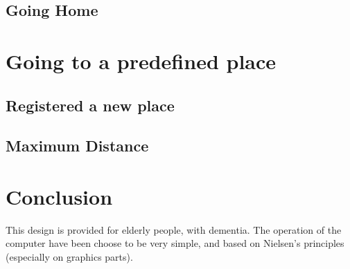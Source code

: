 \documentclass[a4paper,12pt]{article} %
\begin{document}
\subsection{Going Home}
\section{Going to a predefined place}
\subsection{Registered a new place}
\subsection{Maximum Distance}
\section*{Conclusion}
This design is provided for elderly people, with dementia. The operation of the computer have been choose to be very simple, and based on Nielsen's principles (especially on graphics parts). 
\end{document}
